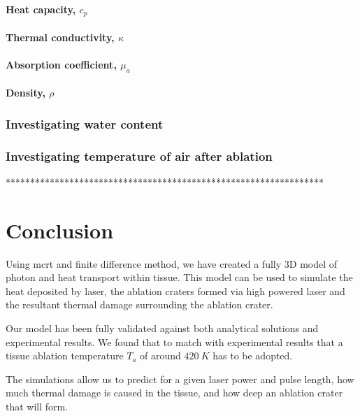 \paragraph{Heat capacity, $c_p$}
\paragraph{Thermal conductivity, $\kappa$}
\paragraph{Absorption coefficient, $\mu_a$}
\paragraph{Density, $\rho$}


\subsubsection{Investigating water content}
 
\subsubsection{Investigating temperature of air after ablation}  
*****************************************************************
\section{Conclusion}


Using \gls{mcrt} and finite difference method, we have created a fully 3D model of photon and heat transport within tissue. This model can be used to simulate the heat deposited by laser, the ablation craters formed via high powered laser and the resultant thermal damage surrounding the ablation crater.

Our model has been fully validated against both analytical solutions and experimental results. We found that to match with experimental results that a tissue ablation temperature $T_a$ of around $420~K$ has to be adopted.

The simulations allow us to predict for a given laser power and pulse length, how much thermal damage is caused in the tissue, and how deep an ablation crater that will form.
